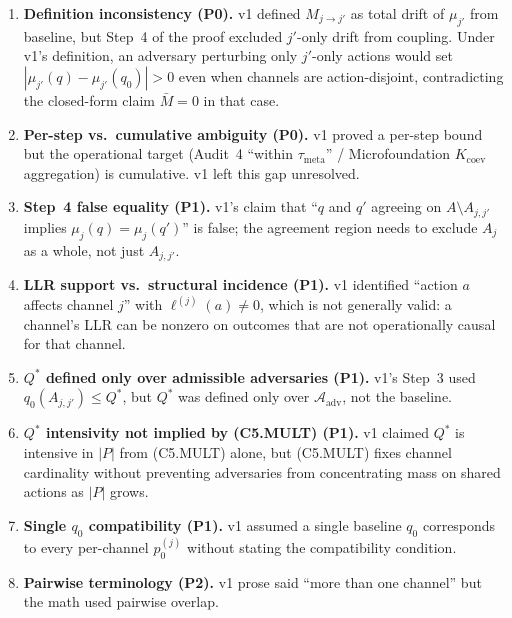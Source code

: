 \documentclass{article}
\newcommand{\taumeta}{\tau_{\mathrm{meta}}}
\begin{document}
\begin{enumerate}
\item \textbf{Definition inconsistency (P0).} v1 defined
  $M_{j \to j'}$ as total drift of $\mu_{j'}$ from baseline, but
  Step~4 of the proof excluded $j'$-only drift from coupling.  Under
  v1's definition, an adversary perturbing only $j'$-only actions
  would set $|\mu_{j'}(q) - \mu_{j'}(q_0)| > 0$ even when channels
  are action-disjoint, contradicting the closed-form claim
  $\bar{M} = 0$ in that case.

\item \textbf{Per-step vs.\ cumulative ambiguity (P0).} v1 proved a
  per-step bound but the operational target (Audit~4 ``within
  $\taumeta$'' / Microfoundation $K_{\mathrm{coev}}$ aggregation)
  is cumulative.  v1 left this gap unresolved.

\item \textbf{Step~4 false equality (P1).} v1's claim that ``$q$ and
  $q'$ agreeing on $A \setminus A_{j,j'}$ implies $\mu_j(q) =
  \mu_j(q')$'' is false; the agreement region needs to exclude $A_j$
  as a whole, not just $A_{j,j'}$.

\item \textbf{LLR support vs.\ structural incidence (P1).} v1
  identified ``action $a$ affects channel $j$'' with $\ell^{(j)}(a)
  \neq 0$, which is not generally valid: a channel's LLR can be
  nonzero on outcomes that are not operationally causal for that
  channel.

\item \textbf{$Q^*$ defined only over admissible adversaries
  (P1).} v1's Step~3 used $q_0(A_{j,j'}) \leq Q^*$, but $Q^*$ was
  defined only over $\mathcal{A}_{\mathrm{adv}}$, not the baseline.

\item \textbf{$Q^*$ intensivity not implied by (C5.MULT) (P1).}
  v1 claimed $Q^*$ is intensive in $|P|$ from (C5.MULT) alone, but
  (C5.MULT) fixes channel cardinality without preventing
  adversaries from concentrating mass on shared actions as $|P|$
  grows.

\item \textbf{Single $q_0$ compatibility (P1).} v1 assumed a single
  baseline $q_0$ corresponds to every per-channel $p_0^{(j)}$
  without stating the compatibility condition.

\item \textbf{Pairwise terminology (P2).} v1 prose said ``more than
  one channel'' but the math used pairwise overlap.
\end{enumerate}
\end{document}
